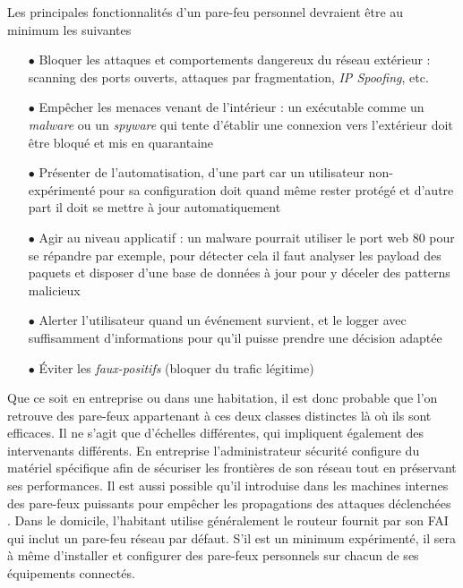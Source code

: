 \documentclass[]{article}
\begin{document}

\par Les principales fonctionnalités d'un pare-feu personnel devraient être au minimum les suivantes \cite{Shimonski2013}
\vspace{0.1cm}
\begin{itemize}
\item[$\bullet$] Bloquer les attaques et comportements dangereux du réseau extérieur : scanning des ports ouverts, attaques par fragmentation, \textit{IP Spoofing}, etc.   
\vspace{0.2cm}
\item[$\bullet$] Empêcher les menaces venant de l'intérieur : un exécutable comme un \textit{malware} ou un \textit{spyware} qui tente d'établir une connexion vers l'extérieur doit être bloqué et mis en quarantaine
\vspace{0.2cm}
\item[$\bullet$] Présenter de l'automatisation, d'une part car un utilisateur non-expérimenté pour sa configuration doit quand même rester protégé et d'autre part il doit se mettre à jour automatiquement
\vspace{0.2cm}
\item[$\bullet$] Agir au niveau applicatif : un malware pourrait utiliser le port web 80 pour se répandre par exemple, pour détecter cela il faut analyser les payload des paquets et disposer d'une base de données à jour pour y déceler des patterns malicieux
\vspace{0.2cm}
\item[$\bullet$] Alerter l'utilisateur quand un événement survient, et le logger avec suffisamment d'informations pour qu'il puisse prendre une décision adaptée
\vspace{0.2cm}
\item[$\bullet$] Éviter les \textit{faux-positifs} (bloquer du trafic légitime)
\end{itemize}
\vspace{0.5cm}
\par Que ce soit en entreprise ou dans une habitation, il est donc probable que l'on retrouve des pare-feux appartenant à ces deux classes distinctes là où ils sont efficaces. Il ne s'agit que d'échelles différentes, qui impliquent également des intervenants différents. En entreprise l'administrateur sécurité configure du matériel spécifique afin de sécuriser les frontières de son réseau tout en préservant ses performances. Il est aussi possible qu'il introduise dans les machines internes des pare-feux puissants pour empêcher les propagations des attaques déclenchées . Dans le domicile, l'habitant utilise généralement le routeur fournit par son FAI qui inclut un pare-feu réseau par défaut. S'il est un minimum expérimenté, il sera à même d'installer et configurer des pare-feux personnels sur chacun de ses équipements connectés.   
\end{document}
